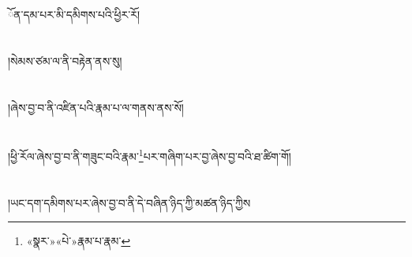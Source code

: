 ོན་དམ་པར་མི་དམིགས་པའི་ཕྱིར་རོ།\chapter{ }།སེམས་ཙམ་ལ་ནི་བརྟེན་ནས་སུ།\chapter{ }།ཞེས་བྱ་བ་ནི་འཛིན་པའི་རྣམ་པ་ལ་གནས་ནས་སོ།\chapter{ }།ཕྱི་རོལ་ཞེས་བྱ་བ་ནི་གཟུང་བའི་རྣམ་\footnote{«སྣར་»«པེ་»རྣམ་པ་རྣམ་}པར་གཞིག་པར་བྱ་ཞེས་བྱ་བའི་ཐ་ཚིག་གོ།\chapter{ }།ཡང་དག་དམིགས་པར་ཞེས་བྱ་བ་ནི་དེ་བཞིན་ཉིད་ཀྱི་མཚན་ཉིད་ཀྱིས